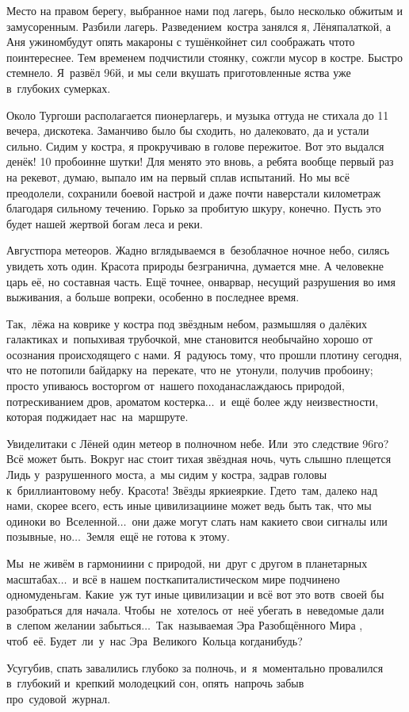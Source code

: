 Место на правом берегу, выбранное нами под лагерь, было несколько обжитым и замусоренным. Разбили лагерь. Разведением~костра занялся я, Лёня\mdash палаткой, а Аня ужином\mdash будут опять макароны с тушёнкой\mdash нет сил соображать что\sdash то поинтереснее. Тем временем подчистили стоянку, сожгли мусор в костре. Быстро стемнело. Я~развёл 96\sdash й, и мы сели вкушать приготовленные яства уже в~глубоких сумерках.

Около Тургоши располагается пионерлагерь, и музыка оттуда не стихала до 11 вечера, дискотека. Заманчиво было бы сходить, но далековато, да и устали сильно. Сидим у костра, я прокручиваю в голове пережитое. Вот это выдался денёк! 10 пробоин\mdash не шутки! Для меня\sdash то это вновь, а ребята вообще первый раз на реке\mdash вот, думаю, выпало им на первый сплав испытаний. Но мы всё преодолели, сохранили боевой настрой и даже почти наверстали километраж благодаря сильному течению. Горько за пробитую шкуру, конечно. Пусть это будет нашей жертвой богам леса и реки.

Август\mdash пора метеоров. Жадно вглядываемся в~безоблачное ночное небо, силясь увидеть хоть один. Красота природы безгранична, думается мне. А человек\mdash не царь её, но составная часть. Ещё точнее, он\mdash варвар, несущий разрушения во имя выживания, а больше вопреки, особенно в последнее время. 

Так,~лёжа на коврике у костра под звёздным небом, размышляя о далёких галактиках и~попыхивая трубочкой, мне становится необычайно хорошо от осознания происходящего с нами. Я~радуюсь тому, что прошли плотину сегодня, что не потопили байдарку на~перекате, что не~утонули, получив пробоину; просто упиваюсь восторгом от~нашего похода\mdash наслаждаюсь природой, потрескиванием дров, ароматом костерка$\ldots$~и~ещё более жду неизвестности, которая поджидает нас~на~маршруте.

Увидели\sdash таки с Лёней один метеор в полночном небе. Или~это следствие 96\sdash го? Всё может быть. Вокруг нас стоит тихая звёздная ночь, чуть слышно плещется Лидь у~разрушенного моста, а~мы сидим у костра, задрав головы к~бриллиантовому небу. Красота! Звёзды яркие\sdash яркие. Где\sdash то~там, далеко над нами, скорее всего, есть иные цивилизации\mdash не может ведь быть так, что мы одиноки во~Вселенной$\ldots$~они даже могут слать нам какие\sdash то свои сигналы или позывные, но$\ldots$~Земля~ещё не готова к этому. 

Мы~не живём в гармонии\mdash ни с природой, ни~друг с другом в планетарных масштабах$\ldots$~и всё в нашем посткапиталистическом мире подчинено одному\mdash деньгам. Какие~уж тут иные цивилизации и всё вот это вот\mdash в~своей бы разобраться для начала. Чтобы~не~хотелось от~неё убегать в~неведомые дали в~слепом желании забыться$\ldots$~Так~называемая Эра Разобщённого Мира \cite{ТуманностьАндромеды}, чтоб~её. Будет~ли~у~нас Эра~Великого~Кольца когда\sdash нибудь?

Усугубив, спать завалились глубоко за полночь, и~я~моментально провалился в~глубокий и~крепкий молодецкий сон, опять~напрочь забыв про~судовой~журнал.

\begin{center}
\end{center}
